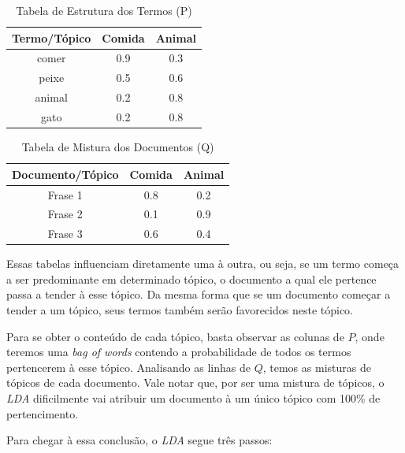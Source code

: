 \begin{table}[h]
\centering
\begin{tabular}{|c|c|c|}
\hline
\textbf{Termo/Tópico} & \textbf{Comida} & \textbf{Animal} \\ \hline
comer & 0.9 & 0.3 \\ \hline
peixe & 0.5 & 0.6 \\ \hline
animal & 0.2 & 0.8 \\ \hline
gato & 0.2 & 0.8 \\ \hline
\end{tabular}
\caption{Tabela de Estrutura dos Termos (P)}
\label{tabelap}
\end{table}

\begin{table}[h]
\centering
\begin{tabular}{|c|c|c|}
\hline
\textbf{Documento/Tópico} & \textbf{Comida} & \textbf{Animal} \\ \hline
Frase 1 & 0.8 & 0.2 \\ \hline
Frase 2 & 0.1 & 0.9 \\ \hline
Frase 3 & 0.6 & 0.4 \\ \hline
\end{tabular}
\caption{Tabela de Mistura dos Documentos (Q)}
\label{tabelaq}
\end{table}

Essas tabelas influenciam diretamente uma à outra, ou seja, se um termo começa a ser predominante em determinado tópico, o documento a qual ele pertence passa a tender à esse tópico. Da mesma forma que se um documento começar a tender a um tópico, seus termos também serão favorecidos neste tópico.

Para se obter o conteúdo de cada tópico, basta observar as colunas de \(P\), onde teremos uma \textit{bag of words} contendo a probabilidade de todos os termos pertencerem à esse tópico. Analisando as linhas de \(Q\), temos as misturas de tópicos de cada documento. Vale notar que, por ser uma mistura de tópicos, o \textit{LDA} dificilmente vai atribuir um documento à um único tópico com 100\% de pertencimento.

Para chegar à essa conclusão, o \textit{LDA} segue três passos:

